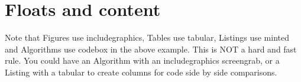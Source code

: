 \section{Floats and content}
Note that Figures use includegraphics, Tables use tabular, Listings use minted and Algorithms use codebox in the above example. This is NOT a hard and fast rule. You could have an Algorithm with an includegraphics screengrab, or a Listing with a tabular to create columns for code side by side comparisons.